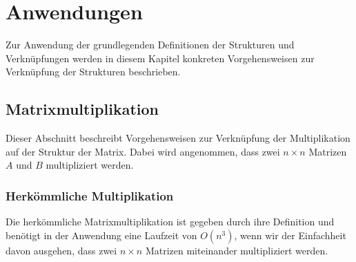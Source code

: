 \documentclass[oneside]{scrbook}
\numberwithin{equation}{section}
\begin{document}
\chapter{Anwendungen}
Zur Anwendung der grundlegenden Definitionen der Strukturen und Verknüpfungen werden in diesem Kapitel konkreten Vorgehensweisen zur Verknüpfung der Strukturen beschrieben.

\section{Matrixmultiplikation}
Dieser Abschnitt beschreibt Vorgehensweisen zur Verknüpfung der Multiplikation auf der Struktur der Matrix. Dabei wird angenommen, dass zwei $n \times n$ Matrizen $A$ und $B$ multipliziert werden.

\subsection{Herkömmliche Multiplikation}
Die herkömmliche Matrixmultiplikation ist gegeben durch ihre Definition und benötigt in der Anwendung eine Laufzeit von $O(n^3)$, wenn wir der Einfachheit davon ausgehen, dass zwei $n \times n$ Matrizen miteinander multipliziert werden.
\end{document}
